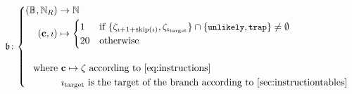 \begin{equation}
  \mathfrak{b}\colon \abracegrouptwo{
    (\blob, \pvmreg) &\to \N\\
    (\mathbf{c}, \imath) &\mapsto \begin{cases}
      1 &\when \{ \instructions_{\imath + 1 + \Fskip(\imath)}, \instructions_{\imath_{\text{target}}} \} \cap \{ \token{unlikely}, \token{trap} \} \neq \emptyset \\
      20 &\otherwise
    \end{cases}
  }{
    \\[0.2pt]
    \where &\mathbf{c} \mapsto \instructions \text{ according to \ref{eq:instructions}}\\
      &\imath_{\text{target}} \text{ is the target of the branch according to \ref{sec:instructiontables}}
  }
\end{equation}

\newcommand*{\ifdstandsrcoverlap}[2]{$\mathfrak{P}(#1, #2)$}
\newcommand*{\ifdstandsrcoverlapshift}[2]{$\mathfrak{P}_{S}(#1, #2)$}
\newcommand*{\loadcost}{$\mathfrak{m}$}
\newcommand*{\storecost}{25}
\newcommand*{\branchcost}{$\mathfrak{b}$}

\newcommand*{\simplealuthreeop}{1&\ifdstandsrcoverlap{1}{2}&1&0&0&0&0}
\newcommand*{\simplealuthreeopthirtytwo}{2&\ifdstandsrcoverlap{2}{3}&1&0&0&0&0}
\newcommand*{\simplealutwoop}{1&\ifdstandsrcoverlap{1}{2}&1&0&0&0&0}
\newcommand*{\simplealutwoopthirtytwo}{2&\ifdstandsrcoverlap{2}{3}&1&0&0&0&0}
\newcommand*{\trivialtwooponecycle}{1&1&1&0&0&0&0}
\newcommand*{\trivialtwooptwocycles}{2&1&2&0&0&0&0}
\newcommand*{\shiftsandrotates}{1&\ifdstandsrcoverlapshift{2}{3}&1&0&0&0&0}
\newcommand*{\shiftsandrotatesthirtytwo}{2&\ifdstandsrcoverlapshift{3}{4}&1&0&0&0&0}
\newcommand*{\shiftsandrotatesalt}{1&3&1&0&0&0&0}
\newcommand*{\shiftsandrotatesaltthirtytwo}{2&4&1&0&0&0&0}
\newcommand*{\regcomp}{3&3&1&0&0&0&0}
\newcommand*{\regcompimm}{3&3&1&0&0&0&0}
\newcommand*{\cmov}{2&2&1&0&0&0&0}
\newcommand*{\cmovimm}{2&3&1&0&0&0&0}
\newcommand*{\minmax}{3&\ifdstandsrcoverlap{2}{3}&1&0&0&0&0}
\newcommand*{\indirectload}{\loadcost&1&1&1&0&0&0}
\newcommand*{\directload}{\loadcost&1&1&1&0&0&0}
\newcommand*{\indirectstoreimm}{\storecost&1&1&0&1&0&0}
\newcommand*{\indirectstore}{\storecost&1&1&0&1&0&0}
\newcommand*{\storeimm}{\storecost&1&1&0&1&0&0}
\newcommand*{\directstore}{\storecost&1&1&0&1&0&0}
\newcommand*{\branch}{\branchcost&1&1&0&0&0&0}
\newcommand*{\branchimm}{\branchcost&1&1&0&0&0&0}
\newcommand*{\divrem}{60&4&1&0&0&0&1}
\newcommand*{\finish}[1]{#1&1&0&0&0&0&0}

